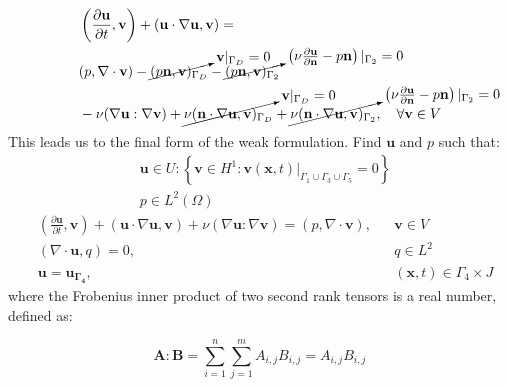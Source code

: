 \begin{align*}
  &\left(\frac{\partial\mathbf{u}}{\partial t}, \mathbf{v}\right)
  + (\mathbf{u}\cdot\nabla\mathbf{u}, \mathbf{v}) = \\
  &(p, \nabla \cdot \mathbf{v})
  - \cancelto{\mathbf{v}|_{\Gamma_D} = 0}{(p\mathbf{n}, \mathbf{v})_{\Gamma_D}}
  - \cancelto{\left(\nu\frac{\partial\mathbf{u}}{\partial\mathbf{n}} - p\mathbf{n}\right)|_{\Gamma_2} = 0}{(p\mathbf{n}, \mathbf{v})_{\Gamma_2}}\\
  &- \nu(\nabla\mathbf{u} : \nabla\mathbf{v})
  + \cancelto{\mathbf{v}|_{\Gamma_D} = 0}{\nu(\mathbf{n}\cdot\nabla\mathbf{u}, \mathbf{v})_{\Gamma_D}}
  + \cancelto{\left(\nu\frac{\partial\mathbf{u}}{\partial\mathbf{n}} - p\mathbf{n}\right)|_{\Gamma_2} = 0}{\nu(\mathbf{n}\cdot\nabla\mathbf{u}, \mathbf{v})_{\Gamma_2}}, \quad \forall\mathbf{v} \in V
\end{align*}
This leads us to the final form of the weak formulation. Find $\mathbf{u}$ and $p$ such that:
\begin{align*}
&\mathbf{u} \in U : \left\{\mathbf{v} \in H^1 : \mathbf{v}(\mathbf{x}, t)|_{\Gamma_1 \cup \Gamma_3 \cup \Gamma_5} = 0\right\} \\
&p \in L^2(\Omega)
\end{align*}
\begin{align}
  \label{eq:2D_DFG_momentum_weak}
  &\left(\frac{\partial\mathbf{u}}{\partial t}, \mathbf{v}\right)
  + (\mathbf{u}\cdot\nabla\mathbf{u}, \mathbf{v}) + \nu(\nabla\mathbf{u} : \nabla\mathbf{v}) =
  (p, \nabla \cdot \mathbf{v}), &&\mathbf{v} \in V \\
  \label{eq:2D_DFG_mass_weak}
  &(\nabla\cdot\mathbf{u}, q) = 0, &&q \in L^2 \\
  &\mathbf{u} = \mathbf{u_{\Gamma_4}}, &&\left(\mathbf{x}, t\right) \in \Gamma_4 \times J  
\end{align}
where the Frobenius inner product of two second rank tensors is a real number, defined as:

\begin{equation*}
	\mathbf{A} : \mathbf{B} = \sum\limits_{i=1}^{n}\sum\limits_{j=1}^{m}A_{i,j}B_{i,j} = A_{i,j}B_{i,j}
\end{equation*}


